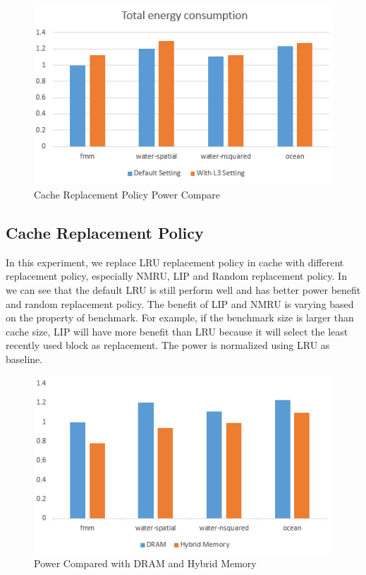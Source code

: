 \begin{figure}[t]
\centering
\includegraphics[width=\columnwidth]{figs/l3power} 
\caption{ Cache Replacement Policy Power Compare}
\label{fig:replace}
\end{figure}



\subsection{Cache Replacement Policy}
In this experiment, we replace LRU replacement policy in cache with different replacement policy, especially NMRU, LIP and Random replacement policy. In ~ we can see that the default LRU is still perform well and has better power benefit and random replacement policy. The benefit of LIP and NMRU is varying based on the property of benchmark. For example, if the benchmark size is larger than cache size, LIP will have more benefit than LRU because it will select the least recently used block as replacement. The power is normalized using LRU as baseline. 



\begin{figure}[t]
\centering
\includegraphics[width=\columnwidth]{figs/hybridpower} 
\caption{Power Compared with DRAM and Hybrid Memory}
\label{fig:hybridpower}
\end{figure}


